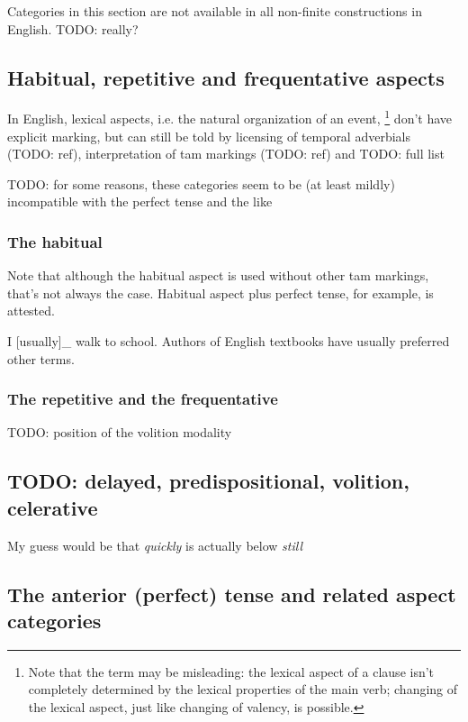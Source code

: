 \documentclass[UTF8, a4paper, oneside, scheme=plain, 12pt]{ctexbook}
\newcommand{\form}[1]{\emph{#1}}
\begin{document}
Categories in this section are not available 
in all non-finite constructions in English. TODO: really?

\subsection{Habitual, repetitive and frequentative aspects}

In English, lexical aspects, i.e. the natural organization of an event,%
\footnote{
    Note that the term may be misleading:
    the lexical aspect of a clause 
    isn't completely determined by the lexical properties of the main verb;
    changing of the lexical aspect, just like changing of valency, is possible.
}
don't have explicit marking, 
but can still be told by licensing of temporal adverbials (TODO: ref),
interpretation of \acs{tam} markings (TODO: ref) and TODO: full list

TODO: for some reasons, these categories seem to be (at least mildly) incompatible with the perfect tense and the like

\subsubsection{The habitual}

Note that although the habitual aspect is used without other \ac{tam} markings, 
that's not always the case. 
Habitual aspect plus perfect tense, for example, 
is attested. 

\begin{exe}
    \ex I [usually]_{} walk to school.
    \ex Authors of English textbooks have usually preferred other terms. 
\end{exe}

\subsubsection{The repetitive and the frequentative}

TODO: position of the volition modality 

\subsection{TODO: delayed, predispositional, volition, celerative}

My guess would be that \form{quickly} is actually below \form{still}

\subsection{The anterior (perfect) tense and related aspect categories}
\end{document}
